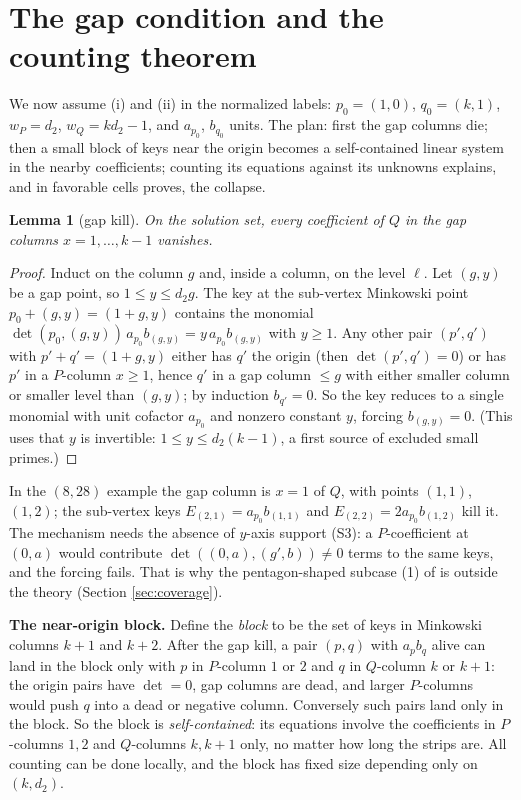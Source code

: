 \documentclass[11pt]{article}
\newtheorem{lemma}[theorem]{Lemma}
\theoremstyle{definition}
\theoremstyle{remark}
\begin{document}
\section{The gap condition and the counting theorem}\label{sec:gap}

We now assume (i) and (ii) in the normalized labels: $p_0=(1,0)$, $q_0=(k,1)$, $w_P=d_2$, $w_Q=kd_2-1$, and $a_{p_0}$, $b_{q_0}$ units. The plan: first the gap columns die; then a small block of keys near the origin becomes a self-contained linear system in the nearby coefficients; counting its equations against its unknowns explains, and in favorable cells proves, the collapse.

\begin{lemma}[gap kill]\label{lem:gapkill}
On the solution set, every coefficient of $Q$ in the gap columns $x=1,\dots,k-1$ vanishes.
\end{lemma}

\begin{proof}
Induct on the column $g$ and, inside a column, on the level $\ell$. Let $(g,y)$ be a gap point, so $1\leq y\leq d_2g$. The key at the sub-vertex Minkowski point $p_0+(g,y)=(1+g,y)$ contains the monomial $\det(p_0,(g,y))\,a_{p_0}b_{(g,y)}=y\,a_{p_0}b_{(g,y)}$ with $y\geq 1$. Any other pair $(p',q')$ with $p'+q'=(1+g,y)$ either has $q'$ the origin (then $\det(p',q')=0$) or has $p'$ in a $P$-column $x\geq 1$, hence $q'$ in a gap column $\leq g$ with either smaller column or smaller level than $(g,y)$; by induction $b_{q'}=0$. So the key reduces to a single monomial with unit cofactor $a_{p_0}$ and nonzero constant $y$, forcing $b_{(g,y)}=0$. (This uses that $y$ is invertible: $1\leq y\leq d_2(k-1)$, a first source of excluded small primes.)
\end{proof}

In the $(8,28)$ example the gap column is $x=1$ of $Q$, with points $(1,1)$, $(1,2)$; the sub-vertex keys $E_{(2,1)}=a_{p_0}b_{(1,1)}$ and $E_{(2,2)}=2a_{p_0}b_{(1,2)}$ kill it. The mechanism needs the absence of $y$-axis support (S3): a $P$-coefficient at $(0,a)$ would contribute $\det((0,a),(g',b))\neq 0$ terms to the same keys, and the forcing fails. That is why the pentagon-shaped subcase (1) of \cite{GGHV} is outside the theory (Section \ref{sec:coverage}).

\medskip
\noindent\textbf{The near-origin block.} Define the \emph{block} to be the set of keys in Minkowski columns $k+1$ and $k+2$. After the gap kill, a pair $(p,q)$ with $a_pb_q$ alive can land in the block only with $p$ in $P$-column $1$ or $2$ and $q$ in $Q$-column $k$ or $k+1$: the origin pairs have $\det=0$, gap columns are dead, and larger $P$-columns would push $q$ into a dead or negative column. Conversely such pairs land only in the block. So the block is \emph{self-contained}: its equations involve the coefficients in $P$-columns $1,2$ and $Q$-columns $k,k+1$ only, no matter how long the strips are. All counting can be done locally, and the block has fixed size depending only on $(k,d_2)$.
\end{document}
